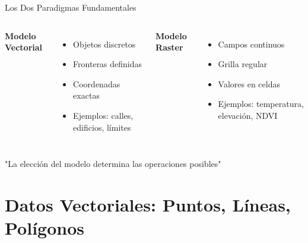 \documentclass[10pt]{beamer}
\begin{document}
\begin{frame}{Los Dos Paradigmas Fundamentales}
    \begin{columns}
        \textbf{Modelo Vectorial}
        \begin{itemize}
            \item Objetos discretos
            \item Fronteras definidas
            \item Coordenadas exactas
            \item Ejemplos: calles, edificios, límites
        \end{itemize}
        
        \textbf{Modelo Raster}
        \begin{itemize}
            \item Campos continuos
            \item Grilla regular
            \item Valores en celdas
            \item Ejemplos: temperatura, elevación, NDVI
        \end{itemize}
    \end{columns}
    
    \vspace{0.5cm}
    \begin{tcolorbox}[colframe=usachblue,colback=blue!5]
        \centering
        \small
        "La elección del modelo determina las operaciones posibles"
    \end{tcolorbox}
\end{frame}

\section{Datos Vectoriales: Puntos, Líneas, Polígonos}
\end{document}
